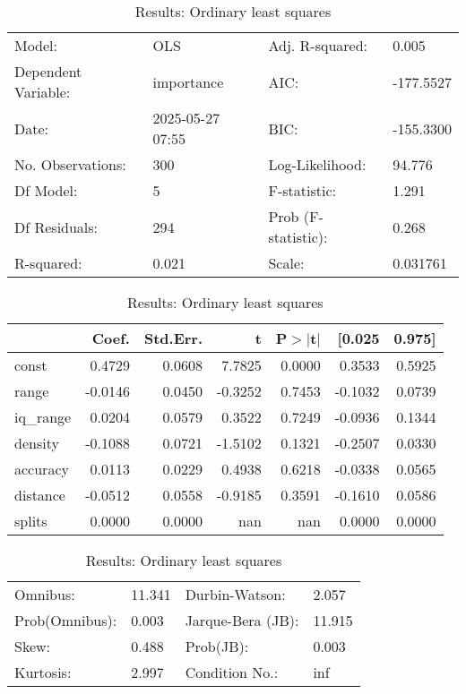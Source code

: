 \begin{table}
\caption{Results: Ordinary least squares}
\label{}
\begin{center}
\begin{tabular}{llll}
\hline
Model:              & OLS              & Adj. R-squared:     & 0.005      \\
Dependent Variable: & importance       & AIC:                & -177.5527  \\
Date:               & 2025-05-27 07:55 & BIC:                & -155.3300  \\
No. Observations:   & 300              & Log-Likelihood:     & 94.776     \\
Df Model:           & 5                & F-statistic:        & 1.291      \\
Df Residuals:       & 294              & Prob (F-statistic): & 0.268      \\
R-squared:          & 0.021            & Scale:              & 0.031761   \\
\hline
\end{tabular}
\end{center}

\begin{center}
\begin{tabular}{lrrrrrr}
\hline
          &   Coef. & Std.Err. &       t & P$> |$t$|$ &  [0.025 & 0.975]  \\
\hline
const     &  0.4729 &   0.0608 &  7.7825 &      0.0000 &  0.3533 & 0.5925  \\
range     & -0.0146 &   0.0450 & -0.3252 &      0.7453 & -0.1032 & 0.0739  \\
iq\_range &  0.0204 &   0.0579 &  0.3522 &      0.7249 & -0.0936 & 0.1344  \\
density   & -0.1088 &   0.0721 & -1.5102 &      0.1321 & -0.2507 & 0.0330  \\
accuracy  &  0.0113 &   0.0229 &  0.4938 &      0.6218 & -0.0338 & 0.0565  \\
distance  & -0.0512 &   0.0558 & -0.9185 &      0.3591 & -0.1610 & 0.0586  \\
splits    &  0.0000 &   0.0000 &     nan &         nan &  0.0000 & 0.0000  \\
\hline
\end{tabular}
\end{center}

\begin{center}
\begin{tabular}{llll}
\hline
Omnibus:       & 11.341 & Durbin-Watson:    & 2.057   \\
Prob(Omnibus): & 0.003  & Jarque-Bera (JB): & 11.915  \\
Skew:          & 0.488  & Prob(JB):         & 0.003   \\
Kurtosis:      & 2.997  & Condition No.:    & inf     \\
\hline
\end{tabular}
\end{center}
\end{table}
